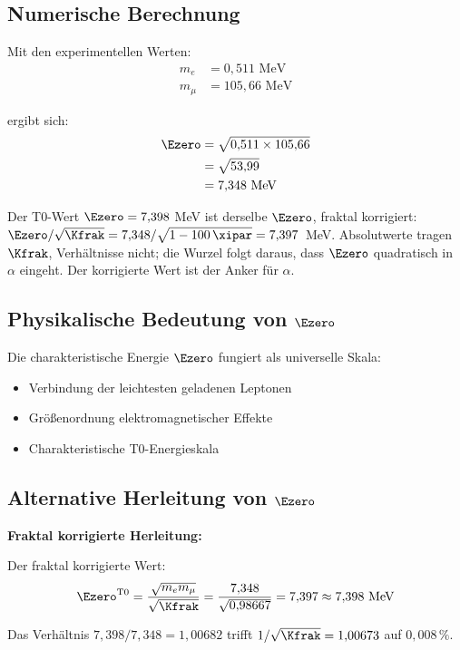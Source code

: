 	\subsection{Numerische Berechnung}
	
	Mit den experimentellen Werten:
	\begin{align}
		m_e &= 0{,}511 \text{ MeV}\\
		m_\mu &= 105{,}66 \text{ MeV}
	\end{align}
	
	ergibt sich:
	\begin{align}
		\Ezero &= \sqrt{0{,}511 \times 105{,}66}\\
		&= \sqrt{53{,}99}\\
		&= 7{,}348 \text{ MeV}
	\end{align}
	
	Der T0-Wert $\Ezero = 7{,}398$ MeV ist derselbe $\Ezero$, fraktal korrigiert: $\Ezero/\sqrt{\Kfrak} = 7{,}348/\sqrt{1-100\,\xipar} = 7{,}397$~MeV. Absolutwerte tragen $\Kfrak$, Verhältnisse nicht; die Wurzel folgt daraus, dass $\Ezero$ quadratisch in $\alpha$ eingeht. Der korrigierte Wert ist der Anker für $\alpha$.
	
	\subsection[Physikalische Bedeutung von E0]{Physikalische Bedeutung von $\Ezero$}
	
	Die charakteristische Energie $\Ezero$ fungiert als universelle Skala:
	\begin{itemize}
		\item Verbindung der leichtesten geladenen Leptonen
		\item Größenordnung elektromagnetischer Effekte
		\item Charakteristische T0-Energieskala
	\end{itemize}
	
	\subsection[Alternative Herleitung von E0]{Alternative Herleitung von $\Ezero$}
	
	\begin{alternative}
		\textbf{Fraktal korrigierte Herleitung:}
		
		Der fraktal korrigierte Wert:
		\begin{equation}
			\Ezero^{\text{T0}} = \frac{\sqrt{m_e m_\mu}}{\sqrt{\Kfrak}} = \frac{7{,}348}{\sqrt{0{,}98667}} = 7{,}397 \approx 7{,}398 \text{ MeV}
		\end{equation}

		Das Verhältnis $7{,}398/7{,}348 = 1{,}00682$ trifft $1/\sqrt{\Kfrak} = 1{,}00673$ auf $0{,}008\,\%$.

	\end{alternative}
	
